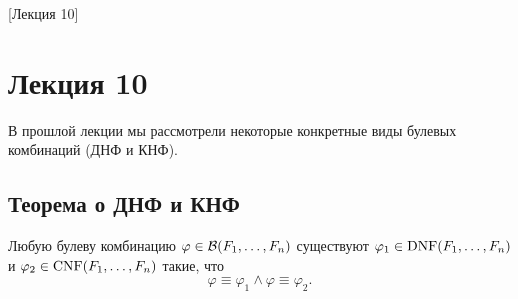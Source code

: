 [Лекция 10]

\section{Лекция 10}

В прошлой лекции мы рассмотрели некоторые конкретные виды булевых комбинаций (ДНФ и КНФ).

\subsection{Теорема о ДНФ и КНФ}

\begin{theorem}
    Любую булеву комбинацию $\varphi \in \mathcal{B}(F_{1}, \ldots, F_{n})$ существуют $\varphi_{1} \in \operatorname{DNF}(F_{1}, \ldots, F_{n})$ и $\varphi_{2} \in \operatorname{CNF}(F_{1}, \ldots, F_{n})$ такие, что
    $$
        \varphi \equiv \varphi_{1} \land \varphi \equiv \varphi_{2}.
    $$
\end{theorem}

